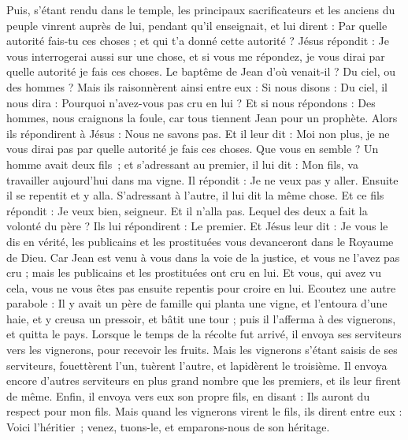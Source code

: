 \begin{multicols}{2}
{
Puis, s’étant rendu dans le temple, les principaux sacrificateurs et les anciens du peuple vinrent auprès de lui, pendant qu’il enseignait, et lui dirent : Par quelle autorité fais-tu ces choses ; et qui t'a donné cette autorité ?
Jésus répondit : Je vous interrogerai aussi sur une chose, et si vous me répondez, je vous dirai par quelle autorité je fais ces choses.
Le baptême de Jean d'où venait-il ? Du ciel, ou des hommes ? Mais ils raisonnèrent ainsi entre eux : Si nous disons : Du ciel, il nous dira : Pourquoi n’avez-vous pas cru en lui ?
Et si nous répondons : Des hommes, nous craignons la foule, car tous tiennent Jean pour un prophète.
Alors ils répondirent à Jésus : Nous ne savons pas. Et il leur dit : Moi non plus, je ne vous dirai pas par quelle autorité je fais ces choses.
Que vous en semble ? Un homme avait deux fils ; et s’adressant au premier, il lui dit : Mon fils, va travailler aujourd'hui dans ma vigne.
Il répondit : Je ne veux pas y aller. Ensuite il se repentit et y alla.
S’adressant à l’autre, il lui dit la même chose. Et ce fils répondit : Je veux bien, seigneur. Et il n’alla pas.
Lequel des deux a fait la volonté du père ? Ils lui répondirent : Le premier. Et Jésus leur dit : Je vous le dis en vérité, les publicains et les prostituées vous devanceront dans le Royaume de Dieu.
Car Jean est venu à vous dans la voie de la justice, et vous ne l'avez pas cru ; mais les publicains et les prostituées ont cru en lui. Et vous, qui avez vu cela, vous ne vous êtes pas ensuite repentis pour croire en lui.
Ecoutez une autre parabole : Il y avait un père de famille qui planta une vigne, et l’entoura d'une haie, et y creusa un pressoir, et bâtit une tour ; puis il l’afferma à des vignerons, et quitta le pays.
Lorsque le temps de la récolte fut arrivé, il envoya ses serviteurs vers les vignerons, pour recevoir les fruits.
Mais les vignerons s’étant saisis de ses serviteurs, fouettèrent l'un, tuèrent l'autre, et lapidèrent le troisième.
Il envoya encore d'autres serviteurs en plus grand nombre que les premiers, et ils leur firent de même.
Enfin, il envoya vers eux son propre fils, en disant : Ils auront du respect pour mon fils.
Mais quand les vignerons virent le fils, ils dirent entre eux : Voici l'héritier ; venez, tuons-le, et emparons-nous de son héritage.
}
\end{multicols}
